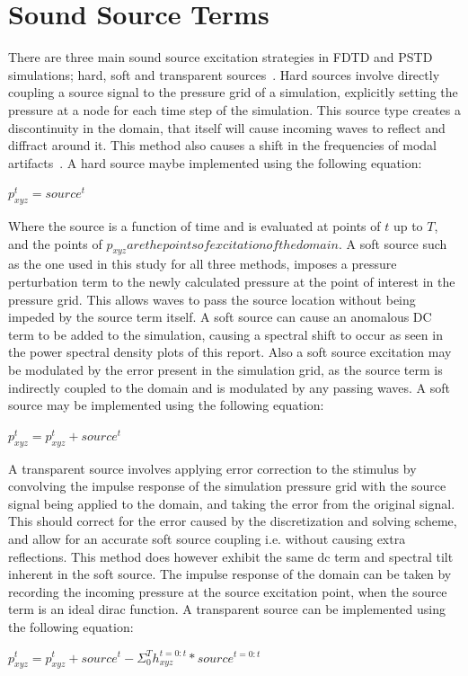 \section{Sound Source Terms}
There are three main sound source excitation strategies in FDTD and PSTD simulations; hard, soft and transparent sources~\cite{Murphy2014}. Hard sources involve directly coupling a source signal to the pressure grid of a simulation, explicitly setting the pressure at a node for each time step of the simulation. This source type creates a discontinuity in the domain, that itself will cause incoming waves to reflect and diffract around it. This method also causes a shift in the frequencies of modal artifacts~\cite{Murphy2014}. A hard source maybe implemented using the following equation:\\
\begin{center}
$p_{xyz}^{t} = source^{t} $
\end{center}
Where the source is a function of time and is evaluated at points of $t$ up to $T$, and the points of $p_{xyz} are the points of excitation of the domain$.
A soft source such as the one used in this study for all three methods, imposes a pressure perturbation term to the newly calculated pressure at the point of interest in the pressure grid. This allows waves to pass the source location without being impeded by the source term itself. A soft source can cause an anomalous DC term to be added to the simulation, causing a spectral shift to occur as seen in the power spectral density plots of this report. Also a soft source excitation may be modulated by the error present in the simulation grid, as the source term is indirectly coupled to the domain and is modulated by any passing waves. A soft source may be implemented using the following equation:\\
\begin{center}
$p_{xyz}^{t} = p_{xyz}^{t} + source^{t}$
\end{center}
A transparent source involves applying error correction to the stimulus by convolving the impulse response of the simulation pressure grid with the source signal being applied to the domain, and taking the error from the original signal. This should correct for the error caused by the discretization and solving scheme, and allow for an accurate soft source coupling i.e. without causing extra reflections. This method does however exhibit the same dc term and spectral tilt inherent in the soft source. The impulse response of the domain can be taken by recording the incoming pressure at the source excitation point, when the source term is an ideal dirac function. A transparent source can be implemented using the following equation:\\
\begin{center}
$p_{xyz}^{t} = p_{xyz}^{t} + source^{t} - \Sigma_0^T h_{xyz}^{t = 0 : t}*source^{t = 0 : t}$
\end{center}



